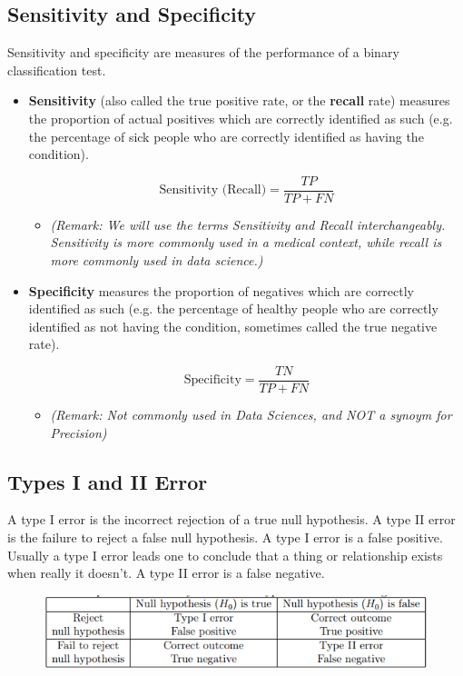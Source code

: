\documentclass[a4paper,12pt]{article}
\begin{document}
\subsection*{Sensitivity and Specificity}
Sensitivity and specificity are measures of the performance of a binary classification
test.
\begin{itemize}
	\item \textbf{Sensitivity} (also called the true positive rate, or the \textbf{recall} rate) measures
	the proportion of actual positives which are correctly identified
	as such (e.g. the percentage of sick people who are correctly identified
	as having the condition).
	
	\[ \mbox{Sensitivity (Recall)} = \frac{TP}{TP +FN}\]
	
	\begin{itemize}
		\item \textit{(Remark: We will use the terms Sensitivity and Recall interchangeably.
			Sensitivity is more commonly used in a medical context, while recall is more
			commonly used in data science.)}
	\end{itemize}
	\item \textbf{Specificity} measures the proportion of negatives which are correctly
	identified as such (e.g. the percentage of healthy people who are correctly
	identified as not having the condition, sometimes called the true
	negative rate).
	
	\[ \mbox{Specificity} = \frac{TN}{TP +FN}\]
	
	\begin{itemize}
		\item \textit{(Remark: Not commonly used in Data Sciences, and NOT a synoym for Precision)}
	\end{itemize}
\end{itemize}
\newpage




\subsection*{Types I and II Error}
A type I error is the incorrect rejection of a true null hypothesis. A type
II error is the failure to reject a false null hypothesis. A type I error is a
false positive. Usually a type I error leads one to conclude that a thing or
relationship exists when really it doesn’t. A type II error is a false negative.
\begin{figure}[h!]
	\centering
	\includegraphics[width=0.7\linewidth]{Table}
\end{figure}
\end{document}

